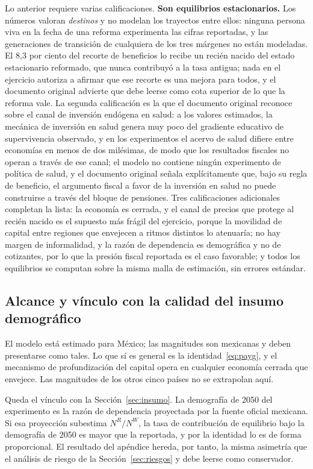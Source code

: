 \documentclass[12pt, letterpaper]{article}
\begin{document}
Lo anterior requiere varias calificaciones. \textbf{Son equilibrios
estacionarios.} Los números valoran \emph{destinos} y no modelan los trayectos
entre ellos: ninguna persona viva en la fecha de una reforma experimenta las cifras
reportadas, y las generaciones de transición de cualquiera de los tres márgenes no
están modeladas. El 8,3 por ciento del recorte de beneficios lo recibe un recién
nacido del estado estacionario reformado, que nunca contribuyó a la tasa antigua;
nada en el ejercicio autoriza a afirmar que ese recorte es una mejora para todos, y
el documento original advierte que debe leerse como cota superior de lo que la
reforma vale. La segunda calificación es la que el documento original reconoce
sobre el canal
de inversión endógena en salud: a los valores estimados, la mecánica de inversión
en salud genera muy poco del gradiente educativo de supervivencia observado, y en
los experimentos el acervo de salud difiere entre economías en menos de dos
milésimas, de modo que los resultados fiscales no operan a través de ese canal; el
modelo no contiene ningún experimento de política de salud, y el documento original
señala explícitamente que, bajo su regla de beneficio, el argumento fiscal a favor de la
inversión en salud no puede construirse a través del bloque de pensiones. Tres
calificaciones adicionales completan la lista: la economía es cerrada, y el canal
de precios que protege al recién nacido es el supuesto más frágil del ejercicio,
porque la movilidad de capital entre regiones que envejecen a ritmos distintos
lo atenuaría; no hay margen de informalidad, y la razón de dependencia es
demográfica y no de cotizantes, por lo que la presión fiscal reportada es el caso
favorable; y todos los equilibrios se computan sobre la misma malla de estimación,
sin errores estándar.

\subsection{Alcance y vínculo con la calidad del insumo demográfico}

El modelo está estimado para México; las magnitudes son mexicanas y deben
presentarse como tales. Lo que sí es general es la identidad~\eqref{eq:payg}, y el
mecanismo de profundización del capital opera en cualquier economía cerrada que
envejece. Las magnitudes de los otros cinco países no se extrapolan aquí.

Queda el vínculo con la Sección~\ref{sec:insumo}. La demografía de 2050 del
experimento es la razón de dependencia proyectada por la fuente oficial mexicana.
Si esa proyección subestima $N^{R}/N^{W}$, la tasa de contribución de equilibrio
bajo la demografía de 2050 es mayor que la reportada, y por la identidad lo es de
forma proporcional. El resultado del apéndice hereda, por tanto, la misma asimetría
que el análisis de riesgo de la Sección~\ref{sec:riesgos} y debe leerse como
conservador.
\end{document}
